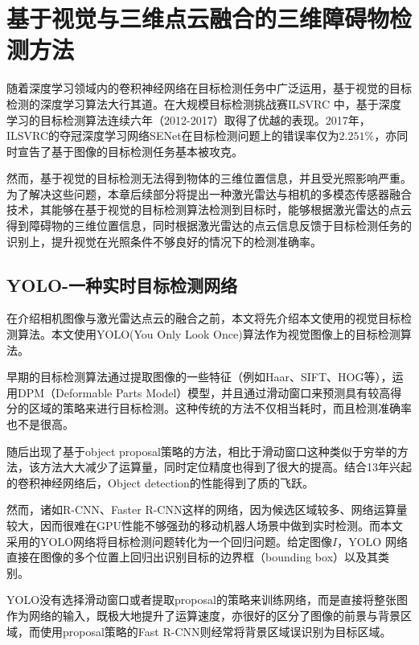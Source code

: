 
\chapter{基于视觉与三维点云融合的三维障碍物检测方法}

随着深度学习领域内的卷积神经网络在目标检测任务中广泛运用，基于视觉的目标检测的深度学习算法大行其道。在大规模目标检测挑战赛ILSVRC 中，基于深度学习的目标检测算法连续六年（2012-2017）取得了优越的表现。2017年，ILSVRC的夺冠深度学习网络SENet在目标检测问题上的错误率仅为$2.251 \%$，亦同时宣告了基于图像的目标检测任务基本被攻克。

然而，基于视觉的目标检测无法得到物体的三维位置信息，并且受光照影响严重。为了解决这些问题，本章后续部分将提出一种激光雷达与相机的多模态传感器融合技术，其能够在基于视觉的目标检测算法检测到目标时，能够根据激光雷达的点云得到障碍物的三维位置信息，同时根据激光雷达的点云信息反馈于目标检测任务的识别上，提升视觉在光照条件不够良好的情况下的检测准确率。

\section{YOLO-一种实时目标检测网络}

在介绍相机图像与激光雷达点云的融合之前，本文将先介绍本文使用的视觉目标检测算法。本文使用YOLO(You Only Look Once)算法作为视觉图像上的目标检测算法。


早期的目标检测算法通过提取图像的一些特征（例如Haar、SIFT、HOG等），运用DPM（Deformable Parts Model）模型，并且通过滑动窗口来预测具有较高得分的区域的策略来进行目标检测。这种传统的方法不仅相当耗时，而且检测准确率也不是很高。

随后出现了基于object proposal策略的方法，相比于滑动窗口这种类似于穷举的方法，该方法大大减少了运算量，同时定位精度也得到了很大的提高。结合13年兴起的卷积神经网络后，Object detection的性能得到了质的飞跃。

然而，诸如R-CNN、Faster R-CNN这样的网络，因为候选区域较多、网络运算量较大，因而很难在GPU性能不够强劲的移动机器人场景中做到实时检测。而本文采用的YOLO网络将目标检测问题转化为一个回归问题。给定图像$I$，YOLO 网络直接在图像的多个位置上回归出识别目标的边界框（bounding box）以及其类别。

YOLO没有选择滑动窗口或者提取proposal的策略来训练网络，而是直接将整张图作为网络的输入，既极大地提升了运算速度，亦很好的区分了图像的前景与背景区域，而使用proposal策略的Fast R-CNN则经常将背景区域误识别为目标区域。

